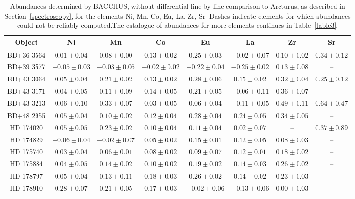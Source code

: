 \begin{table*}
\caption{Abundances determined by BACCHUS, without differential line-by-line comparison to Arcturus, as described in Section~\ref{spectroscopy}, for the elements Ni, Mn, Co, Eu, La, Zr, Sr. Dashes indicate elements for which abundances could not be reliably computed.The catalogue of abundances for more elements continues in Table~\ref{table3}.\label{table2}}
\begin{tabular}{cccccccc}
\hline \hline
Object & Ni & Mn & Co & Eu & La & Zr & Sr \\
\hline
BD+36 3564 & $0.01 \pm 0.04$ & $0.08 \pm 0.00$ & $0.13 \pm 0.02$ & $0.25 \pm 0.03$ & $-0.02 \pm 0.07$ & $0.10 \pm 0.02$ & $0.34 \pm 0.12$ \\
BD+39 3577 & $-0.05 \pm 0.03$ & $-0.03 \pm 0.06$ & $-0.02 \pm 0.02$ & $-0.22 \pm 0.04$ & $-0.25 \pm 0.02$ & $0.13 \pm 0.08$ & -- \\
BD+43 3064 & $0.05 \pm 0.04$ & $0.21 \pm 0.02$ & $0.13 \pm 0.02$ & $0.28 \pm 0.06$ & $0.15 \pm 0.02$ & $0.32 \pm 0.04$ & $0.25 \pm 0.12$ \\
BD+43 3171 & $0.04 \pm 0.05$ & $0.11 \pm 0.09$ & $0.14 \pm 0.05$ & $0.21 \pm 0.05$ & $-0.06 \pm 0.11$ & $0.36 \pm 0.07$ & -- \\
BD+43 3213 & $0.06 \pm 0.10$ & $0.33 \pm 0.07$ & $0.03 \pm 0.05$ & $0.06 \pm 0.04$ & $-0.11 \pm 0.05$ & $0.49 \pm 0.11$ & $0.64 \pm 0.47$ \\
BD+48 2955 & $0.05 \pm 0.04$ & $0.10 \pm 0.02$ & $0.12 \pm 0.04$ & $0.28 \pm 0.04$ & $0.24 \pm 0.05$ & $0.34 \pm 0.05$ & -- \\
HD 174020 & $0.05 \pm 0.05$ & $0.23 \pm 0.02$ & $0.10 \pm 0.04$ & $0.11 \pm 0.04$ & $0.02 \pm 0.07$ & -- & $0.37 \pm 0.89$ \\
HD 174829 & $-0.06 \pm 0.04$ & $-0.02 \pm 0.07$ & $0.05 \pm 0.02$ & $0.15 \pm 0.01$ & $0.12 \pm 0.05$ & $0.08 \pm 0.03$ & -- \\
HD 175740 & $0.03 \pm 0.04$ & $0.06 \pm 0.01$ & $0.08 \pm 0.02$ & $0.09 \pm 0.07$ & $0.12 \pm 0.01$ & $0.18 \pm 0.02$ & -- \\
HD 175884 & $0.04 \pm 0.05$ & $0.14 \pm 0.02$ & $0.10 \pm 0.02$ & $0.19 \pm 0.02$ & $0.14 \pm 0.03$ & $0.26 \pm 0.02$ & -- \\
HD 178797 & $0.05 \pm 0.04$ & $0.13 \pm 0.11$ & $0.18 \pm 0.03$ & $0.26 \pm 0.02$ & $0.14 \pm 0.02$ & $0.23 \pm 0.03$ & -- \\
HD 178910 & $0.28 \pm 0.07$ & $0.21 \pm 0.05$ & $0.17 \pm 0.03$ & $-0.02 \pm 0.06$ & $-0.13 \pm 0.06$ & $0.00 \pm 0.03$ & -- \\

\end{tabular}
\end{table*}
